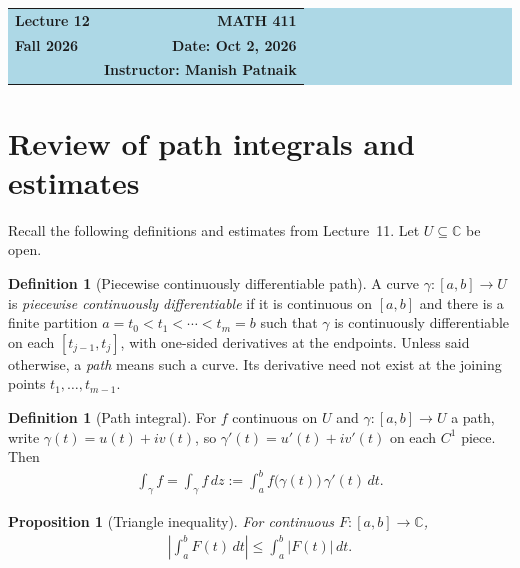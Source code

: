 \documentclass[11pt]{article}
\theoremstyle{plain}
\newtheorem{proposition}[theorem]{Proposition}
\theoremstyle{definition}
\newtheorem{definition}[theorem]{Definition}
\theoremstyle{remark}
\numberwithin{equation}{section}
\newcommand{\be}{\begin{eqnarray}}
\newcommand{\ee}{\end{eqnarray}}
\newcommand{\C}{\mathbb{C}}
\begin{document}
\begin{center}
  \colorbox{lightblue}{%
    \begin{minipage}{0.94\textwidth}
      \vspace{0.55em}
      \begin{tabular*}{\textwidth}{@{\extracolsep{\fill}}lr}
        {\color{courseblue}\bfseries\LARGE Lecture 12} &
        {\color{courseblue}\bfseries\LARGE MATH 411}\\[0.35em]
        \textbf{Fall 2026} & \textbf{Date: Oct 2, 2026}\\
        & \textbf{Instructor: Manish Patnaik}
      \end{tabular*}
      \vspace{0.45em}
    \end{minipage}}
\end{center}

\setcounter{tocdepth}{1}
\tableofcontents
\vspace{0.45em}

\section{Review of path integrals and estimates}
Recall the following definitions and estimates from Lecture~11. Let
$U\subseteq\C$ be open.

\begin{definition}[Piecewise continuously differentiable path]
A curve $\gamma\colon[a,b]\to U$ is \emph{piecewise continuously differentiable}
if it is continuous on $[a,b]$ and there is a finite partition
$a=t_0<t_1<\cdots<t_m=b$ such that $\gamma$ is continuously differentiable
on each $[t_{j-1},t_j]$, with one-sided derivatives at the endpoints.
Unless said otherwise, a \emph{path} means such a curve. Its derivative
need not exist at the joining points $t_1,\ldots,t_{m-1}$.
\end{definition}

\begin{definition}[Path integral]
\label{def:path-int}
For $f$ continuous on $U$ and $\gamma\colon[a,b]\to U$ a path, write
$\gamma(t)=u(t)+iv(t)$, so $\gamma'(t)=u'(t)+iv'(t)$ on each $C^1$ piece. Then
\be
 \int_\gamma f=\int_\gamma f\,dz:=\int_a^bf\bigl(\gamma(t)\bigr)\,\gamma'(t)\,dt.
\ee
\end{definition}

\begin{proposition}[Triangle inequality]
\label{prop:basic-est}
For continuous $F\colon[a,b]\to\C$,
\be
 \left|\int_a^bF(t)\,dt\right|\leq\int_a^b|F(t)|\,dt.
\ee
\end{proposition}
\end{document}
